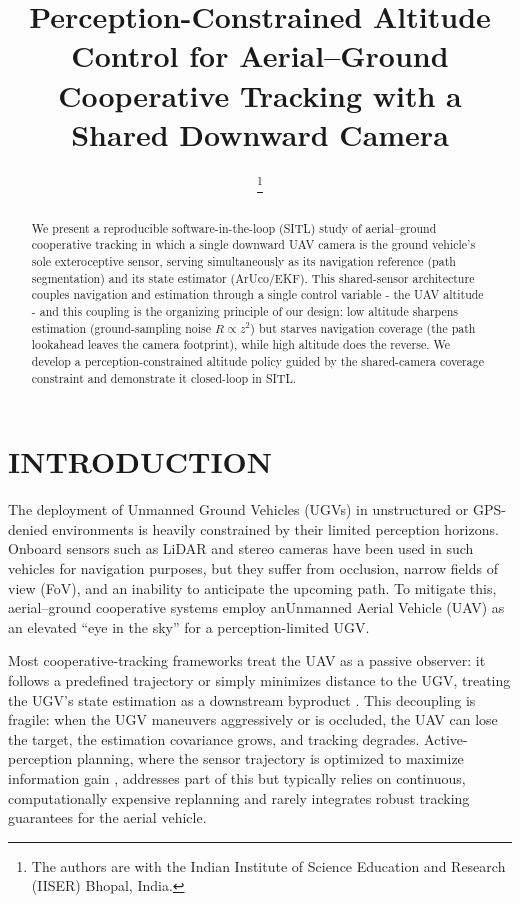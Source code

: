 \documentclass[letterpaper, 10 pt, conference]{ieeeconf}  %
\title{\LARGE \bf
Perception-Constrained Altitude Control for Aerial--Ground \\
Cooperative Tracking with a Shared Downward Camera
}
\author{\censor{Shlok Mehndiratta, Divyam Sood, Prashant Gupta, and Arijit Sen}%
\thanks{The authors are with the Indian Institute of Science Education and
Research (IISER) Bhopal, India.
\censor{
{\tt\small \{shlokm23, divyam23, prashant23\}@iiserb.ac.in},
{\tt\small ajsen@iiserb.ac.in}}%
}
}
\begin{document}
\maketitle
\thispagestyle{empty}
\pagestyle{empty}


\begin{abstract}
We present a reproducible software-in-the-loop (SITL) study of
aerial--ground cooperative tracking in which a single downward UAV camera is the ground
vehicle's {sole} exteroceptive sensor, serving simultaneously as its navigation
reference (path segmentation) and its state estimator (ArUco/EKF). This shared-sensor architecture couples navigation and estimation through a single control variable - the UAV
altitude - and this coupling is the organizing principle of our design: low altitude sharpens estimation (ground-sampling noise $R\propto z^2$) but starves navigation coverage (the path
lookahead leaves the camera footprint), while high altitude does the reverse. We develop a perception-constrained altitude policy guided by the shared-camera coverage constraint and {demonstrate it closed-loop in SITL}. 
\end{abstract}


\section{INTRODUCTION}

The deployment of Unmanned Ground Vehicles (UGVs) in unstructured or GPS-denied environments is heavily constrained by their limited perception horizons. Onboard sensors such as LiDAR and stereo cameras have been used in such vehicles for navigation purposes, but they suffer from occlusion,
narrow fields of view (FoV), and an inability to anticipate the upcoming path. To mitigate this, aerial--ground cooperative systems employ anUnmanned Aerial Vehicle (UAV) as an elevated ``eye in the sky'' for a
perception-limited UGV.

Most cooperative-tracking frameworks treat the UAV as a {passive} observer:
it follows a predefined trajectory or simply minimizes distance to the UGV,
treating the UGV's state estimation as a downstream byproduct
\cite{mayne2000constrained}. This decoupling is fragile: when the UGV maneuvers
aggressively or is occluded, the UAV can lose the target, the estimation
covariance grows, and tracking degrades. Active-perception planning, where the
sensor trajectory is optimized to maximize information gain
\cite{falanga2018pampc}, addresses part of this but typically relies on
continuous, computationally expensive replanning and rarely integrates robust
tracking guarantees for the aerial vehicle.
\end{document}
